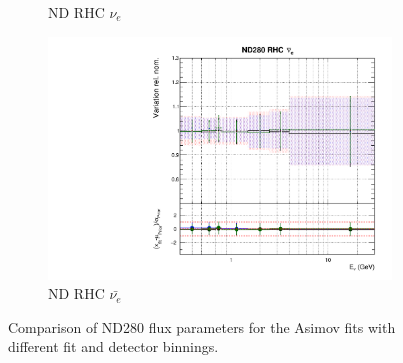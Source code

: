 \begin{figure}
\begin{subfigure}{0.45\textwidth}
  \caption{ND RHC $\nu_{e}$}
\end{subfigure}
\begin{subfigure}{0.45\textwidth}
  \centering
  \includegraphics[width=0.75\linewidth]{figs/polyasmvsflux_7}
  \caption{ND RHC $\bar{\nu_e}$}
\end{subfigure}
\caption{Comparison of ND280 flux parameters for the Asimov fits with different fit and detector binnings.}
\label{fig:polyasmvsfluxND}
\end{figure}

